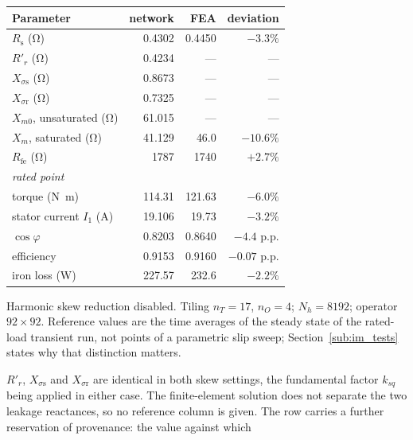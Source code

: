 \documentclass[10pt,a4paper,twocolumn]{article}
\theoremstyle{plain}
\theoremstyle{remark}
\begin{document}
\begin{table}[!ht]
\centering
\begin{threeparttable}
\footnotesize
\begin{tabular}{@{}lrrr@{}}
\toprule
Parameter & network & FEA & deviation\\
\midrule
$R_{\mathrm{s}}$ (\si{\ohm})            & 0.4302  & 0.4450 & $-3.3\%$\\
$R'_r$ (\si{\ohm})\tnote{a}             & 0.4234  & ---    & ---\\
$X_{\sigma\mathrm{s}}$ (\si{\ohm})      & 0.8673  & ---    & ---\\
$X_{\sigma\mathrm{r}}$ (\si{\ohm})      & 0.7325  & ---    & ---\\
$X_{m0}$, unsaturated (\si{\ohm})       & 61.015  & ---    & ---\\
$X_{m}$, saturated (\si{\ohm})          & 41.129  & 46.0   & $-10.6\%$\\
$R_{\mathrm{fe}}$ (\si{\ohm})\tnote{b}  & 1787    & 1740   & $+2.7\%$\\
\midrule
\multicolumn{4}{l}{\emph{rated point}}\\
torque (\si{\newton\metre})             & 114.31  & 121.63 & $-6.0\%$\\
stator current $I_1$ (\si{\ampere})     & 19.106  & 19.73  & $-3.2\%$\\
$\cos\varphi$                           & 0.8203  & 0.8640 & $-4.4$ p.p.\\
efficiency                              & 0.9153  & 0.9160 & $-0.07$ p.p.\\
iron loss (\si{\watt})                  & 227.57  & 232.6  & $-2.2\%$\\
\bottomrule
\end{tabular}
\begin{tablenotes}[flushleft]\footnotesize
\item Harmonic skew reduction disabled. Tiling $n_T=17$,
$n_O=4$; $N_h=\num{8192}$; operator $92\times92$. Reference values are
the time averages of the steady state of the rated-load transient run,
not points of a parametric slip sweep; Section~\ref{sub:im_tests}
states why that distinction matters.
\item[a] $R'_r$, $X_{\sigma\mathrm{s}}$ and $X_{\sigma\mathrm{r}}$ are
identical in both skew settings, the fundamental factor $k_{sq}$ being
applied in either case. The finite-element solution does not separate
the two leakage reactances, so no reference column is given. The row
carries a further reservation of provenance: the value against which

\end{tablenotes}
\end{threeparttable}
\end{table}
\end{document}
